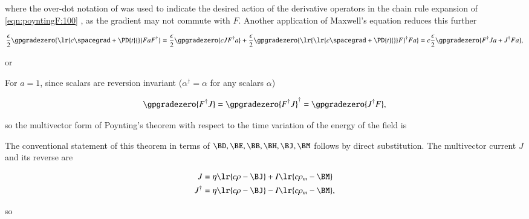where
the over-dot notation of
\citep{hestenes1999nfc} was used to indicate the desired action of the derivative operators in the
chain rule expansion of
\cref{eqn:poyntingF:100}
, as the gradient may not commute with \( F \).  Another application of Maxwell's equation reduces this further

\begin{dmath}\label{eqn:poyntingF:960}
\frac{\epsilon}{2} \gpgradezero{ \lr{ c \spacegrad + \PD{t}{} } F a F^\dagger }
=
\frac{\epsilon}{2} \gpgradezero{ c J F^\dagger a }
+
\frac{\epsilon}{2} \gpgradezero{ \lr{ \lr{ c \spacegrad + \PD{t}{} } F }^\dagger F a }
=
c \frac{\epsilon}{2} \gpgradezero{ F^\dagger J a + J^\dagger F a },
\end{dmath}

or

For \( a = 1 \), since scalars are reversion invariant (\(\alpha^\dagger = \alpha\) for any scalars \( \alpha \))

\begin{equation}\label{eqn:poyntingF:1000}
\gpgradezero{ F^\dagger J }
=
\gpgradezero{ F^\dagger J }^\dagger
=
\gpgradezero{ J^\dagger F },
\end{equation}

so the
multivector form of Poynting's theorem with respect to the time variation of the energy of the field is


The conventional statement of this theorem in terms of \( \BD, \BE, \BB, \BH, \BJ, \BM \) follows by direct substitution.
The multivector current \( J \) and its reverse are

\begin{dmath}\label{eqn:poyntingF:160}
\begin{aligned}
J &= \eta \lr{ c \rho - \BJ } + I \lr{ c \rho_m - \BM } \\
J^\dagger &= \eta \lr{ c \rho - \BJ } - I \lr{ c \rho_m - \BM },
\end{aligned}
\end{dmath}

so

